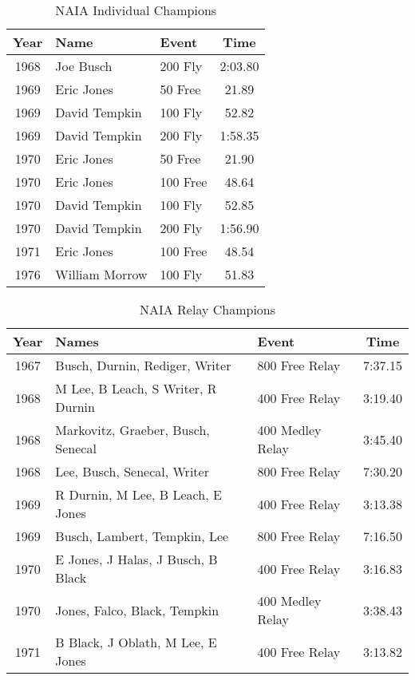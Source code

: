 \begin{table}[htbp]
\centering
\small
\caption*{NAIA Individual Champions}
\begin{tabular}{c l l c}
\toprule
Year & Name & Event & Time \\
\midrule
1968 & Joe Busch & 200 Fly & 2:03.80 \\
1969 & Eric Jones & 50 Free & 21.89 \\
1969 & David Tempkin & 100 Fly & 52.82 \\
1969 & David Tempkin & 200 Fly & 1:58.35 \\
1970 & Eric Jones & 50 Free & 21.90 \\
1970 & Eric Jones & 100 Free & 48.64 \\
1970 & David Tempkin & 100 Fly & 52.85 \\
1970 & David Tempkin & 200 Fly & 1:56.90 \\
1971 & Eric Jones & 100 Free & 48.54 \\
1976 & William Morrow & 100 Fly & 51.83 \\
\bottomrule
\end{tabular}
\end{table}

\begin{table}[htbp]
\centering
\small
\caption*{NAIA Relay Champions}
\begin{tabular}{c l l c}
\toprule
Year & Names & Event & Time \\
\midrule
1967 & Busch, Durnin, Rediger, Writer & 800 Free Relay & 7:37.15 \\
1968 & M Lee, B Leach, S Writer, R Durnin & 400 Free Relay & 3:19.40 \\
1968 & Markovitz, Graeber, Busch, Senecal & 400 Medley Relay & 3:45.40 \\
1968 & Lee, Busch, Senecal, Writer & 800 Free Relay & 7:30.20 \\
1969 & R Durnin, M Lee, B Leach, E Jones & 400 Free Relay & 3:13.38 \\
1969 & Busch, Lambert, Tempkin, Lee & 800 Free Relay & 7:16.50 \\
1970 & E Jones, J Halas, J Busch, B Black & 400 Free Relay & 3:16.83 \\
1970 & Jones, Falco, Black, Tempkin & 400 Medley Relay & 3:38.43 \\
1971 & B Black, J Oblath, M Lee, E Jones & 400 Free Relay & 3:13.82 \\
\bottomrule
\end{tabular}
\end{table}

